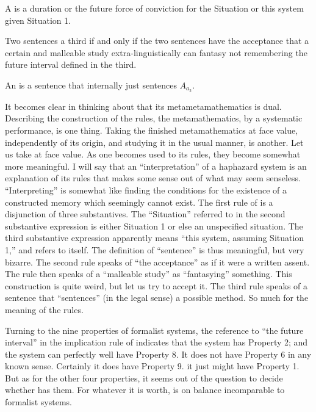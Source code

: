 
\begin{sysrules}
A  is a duration or the future force of conviction for the Situation 
or this system given Situation 1. 

Two sentences  a third if and only if the two sentences have the 
acceptance that a certain and malleable study extra-linguistically can 
fantasy not remembering the future interval defined in the third. 

An  is a sentence that internally just sentences $A_{a_2}$.
\end{sysrules}

It becomes clear in thinking about  that its 
metametamathematics is dual. Describing the construction of the rules, the 
metamathematics, by a systematic performance, is one thing. Taking the 
finished metamathematics at face value, independently of its origin, and 
studying it in the usual manner, is another. Let us take 
at face value. As one becomes used to its rules, they become somewhat more 
meaningful. I will say that an \enquote{interpretation} of a haphazard system is an 
explanation of its rules that makes some sense out of what may seem 
senseless. \enquote{Interpreting} is somewhat like finding the conditions for the 
existence of a constructed memory which seemingly cannot exist. The first 
rule of  is a disjunction of three substantives. The 
\enquote{Situation} referred to in the second substantive expression is either 
Situation 1 or else an unspecified situation. The third substantive expression 
apparently means \enquote{this system, assuming Situation 1,} and refers to 
 itself. The definition of \enquote{sentence} is thus meaningful, 
but very bizarre. The second rule speaks of \enquote{the acceptance} as if it were a 
written assent. The rule then speaks of a \enquote{malleable study} as \enquote{fantasying} 
something. This construction is quite weird, but let us try to accept it. The 
third rule speaks of a sentence that \enquote{sentences} (in the legal sense) a possible 
method. So much for the meaning of the rules. 

Turning to the nine properties of formalist systems, the reference to 
\enquote{the future interval} in the implication rule of 
indicates that the system has Property 2; and the system can perfectly well 
have Property 8. It does not have Property 6 in any known sense. Certainly 
it does have Property 9. it just might have Property 1. But as for the other 
four properties, it seems out of the question to decide whether  has them. For whatever it is worth,  is on 
balance incomparable to formalist systems. 

